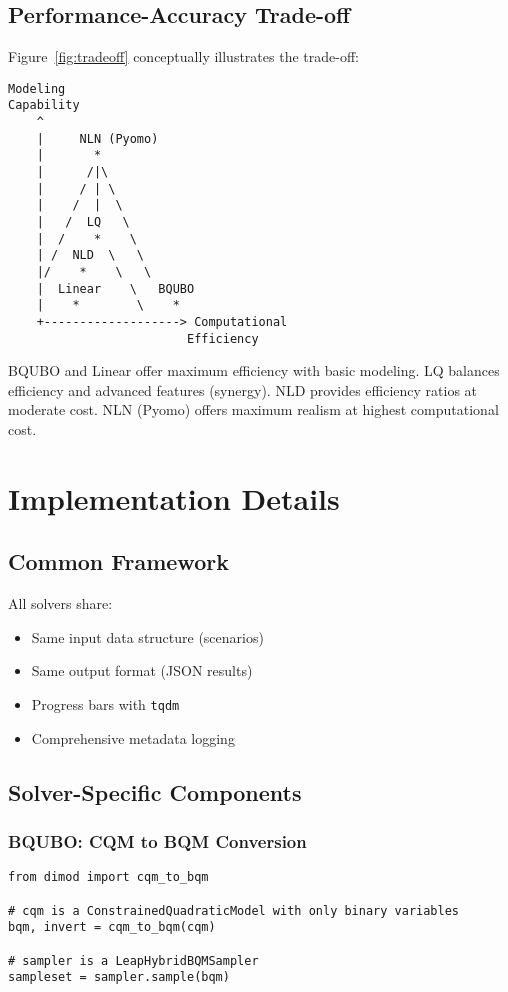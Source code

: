 \documentclass[11pt,a4paper]{article}
\begin{document}
\subsection{Performance-Accuracy Trade-off}

Figure~\ref{fig:tradeoff} conceptually illustrates the trade-off:

\begin{verbatim}
Modeling
Capability
    ^
    |     NLN (Pyomo)
    |       *
    |      /|\
    |     / | \
    |    /  |  \
    |   /  LQ   \
    |  /    *    \
    | /  NLD  \   \
    |/    *    \   \
    |  Linear    \   BQUBO
    |    *        \    *
    +-------------------> Computational
                         Efficiency
\end{verbatim}

BQUBO and Linear offer maximum efficiency with basic modeling.
LQ balances efficiency and advanced features (synergy).
NLD provides efficiency ratios at moderate cost.
NLN (Pyomo) offers maximum realism at highest computational cost.

\section{Implementation Details}

\subsection{Common Framework}

All solvers share:
\begin{itemize}
    \item Same input data structure (scenarios)
    \item Same output format (JSON results)
    \item Progress bars with \texttt{tqdm}
    \item Comprehensive metadata logging
\end{itemize}

\subsection{Solver-Specific Components}

\subsubsection{BQUBO: CQM to BQM Conversion}
\begin{verbatim}
from dimod import cqm_to_bqm

# cqm is a ConstrainedQuadraticModel with only binary variables
bqm, invert = cqm_to_bqm(cqm)

# sampler is a LeapHybridBQMSampler
sampleset = sampler.sample(bqm)
\end{verbatim}
\end{document}
